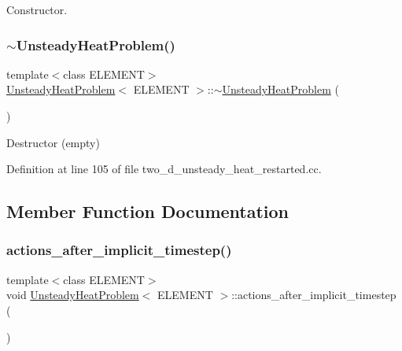 Constructor. 

\mbox{\label{classUnsteadyHeatProblem_acd342b40828d9e18b3571e00b3d34add}} 
\subsubsection{\texorpdfstring{$\sim$\+Unsteady\+Heat\+Problem()}{~UnsteadyHeatProblem()}\hspace{0.1cm}{\footnotesize\ttfamily [2/2]}}
{\footnotesize\ttfamily template$<$class E\+L\+E\+M\+E\+NT$>$ \\
\hyperlink{classUnsteadyHeatProblem}{Unsteady\+Heat\+Problem}$<$ E\+L\+E\+M\+E\+NT $>$\+::$\sim$\hyperlink{classUnsteadyHeatProblem}{Unsteady\+Heat\+Problem} (\begin{DoxyParamCaption}{ }\end{DoxyParamCaption})\hspace{0.3cm}{\ttfamily [inline]}}



Destructor (empty) 



Definition at line 105 of file two\+\_\+d\+\_\+unsteady\+\_\+heat\+\_\+restarted.\+cc.



\subsection{Member Function Documentation}
\mbox{\label{classUnsteadyHeatProblem_afd14cbe343adfa39e3b8b2ca681c5020}} 
\subsubsection{\texorpdfstring{actions\+\_\+after\+\_\+implicit\+\_\+timestep()}{actions\_after\_implicit\_timestep()}\hspace{0.1cm}{\footnotesize\ttfamily [1/2]}}
{\footnotesize\ttfamily template$<$class E\+L\+E\+M\+E\+NT$>$ \\
void \hyperlink{classUnsteadyHeatProblem}{Unsteady\+Heat\+Problem}$<$ E\+L\+E\+M\+E\+NT $>$\+::actions\+\_\+after\+\_\+implicit\+\_\+timestep (\begin{DoxyParamCaption}{ }\end{DoxyParamCaption})\hspace{0.3cm}{\ttfamily [inline]}}



